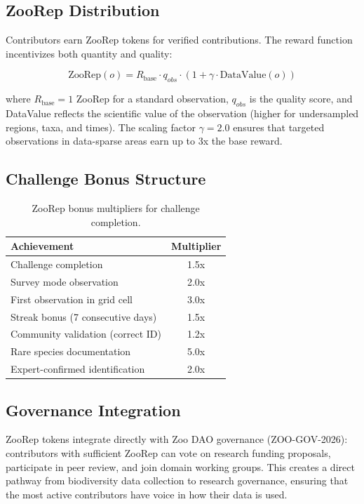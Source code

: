 \documentclass[11pt,a4paper]{article}
\begin{document}
\subsection{ZooRep Distribution}

Contributors earn ZooRep tokens for verified contributions. The reward
function incentivizes both quantity and quality:

\begin{equation}
  \text{ZooRep}(o) = R_{\text{base}} \cdot q_{obs} \cdot
  (1 + \gamma \cdot \text{DataValue}(o))
\end{equation}

where $R_{\text{base}} = 1$ ZooRep for a standard observation, $q_{obs}$
is the quality score, and DataValue reflects the scientific value of the
observation (higher for undersampled regions, taxa, and times). The
scaling factor $\gamma = 2.0$ ensures that targeted observations in
data-sparse areas earn up to 3x the base reward.

\subsection{Challenge Bonus Structure}

\begin{table}[H]
\centering
\caption{ZooRep bonus multipliers for challenge completion.}
\label{tab:bonuses}
\begin{tabular}{lc}
\toprule
\textbf{Achievement} & \textbf{Multiplier} \\
\midrule
Challenge completion & 1.5x \\
Survey mode observation & 2.0x \\
First observation in grid cell & 3.0x \\
Streak bonus (7 consecutive days) & 1.5x \\
Community validation (correct ID) & 1.2x \\
Rare species documentation & 5.0x \\
Expert-confirmed identification & 2.0x \\
\bottomrule
\end{tabular}
\end{table}

\subsection{Governance Integration}

ZooRep tokens integrate directly with Zoo DAO governance (ZOO-GOV-2026):
contributors with sufficient ZooRep can vote on research funding
proposals, participate in peer review, and join domain working groups.
This creates a direct pathway from biodiversity data collection to
research governance, ensuring that the most active contributors have
voice in how their data is used.
\end{document}
